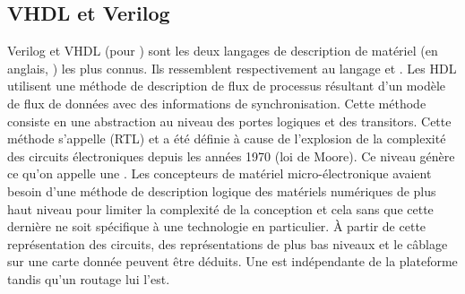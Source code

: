 
\subsection{VHDL et Verilog}

Verilog et VHDL (pour ) sont les deux langages de description de matériel (en anglais, ) les plus connus. Ils ressemblent respectivement au langage  et . Les HDL utilisent une méthode de description de flux de processus résultant d'un modèle de flux de données avec des informations de synchronisation. Cette méthode consiste en une abstraction au niveau des portes logiques et des transitors. Cette méthode s'appelle  (RTL) et a été définie à cause de l'explosion de la complexité des circuits électroniques depuis les années 1970 (loi de Moore). Ce niveau génère ce qu'on appelle une . Les concepteurs de matériel micro-électronique avaient besoin d'une méthode de description logique des matériels numériques de plus haut niveau pour limiter la complexité de la conception et cela sans que cette dernière ne soit spécifique à une technologie en particulier. À partir de cette représentation des circuits, des représentations de plus bas niveaux et le câblage sur une carte donnée peuvent être déduits. Une  est indépendante de la plateforme tandis qu'un routage lui l'est.\\

